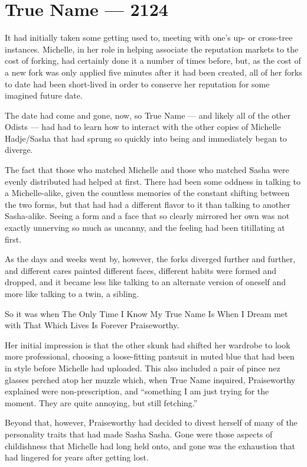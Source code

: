 \hypertarget{true-name-2124}{%
\chapter{True Name — 2124}\label{true-name-2124}}

It had initially taken some getting used to, meeting with one's up- or cross-tree instances. Michelle, in her role in helping associate the reputation markets to the cost of forking, had certainly done it a number of times before, but, as the cost of a new fork was only applied five minutes after it had been created, all of her forks to date had been short-lived in order to conserve her reputation for some imagined future date.

The date had come and gone, now, so True Name — and likely all of the other Odists — had had to learn how to interact with the other copies of Michelle Hadje/Sasha that had sprung so quickly into being and immediately began to diverge.

The fact that those who matched Michelle and those who matched Sasha were evenly distributed had helped at first. There had been some oddness in talking to a Michelle-alike, given the countless memories of the constant shifting between the two forms, but that had had a different flavor to it than talking to another Sasha-alike. Seeing a form and a face that so clearly mirrored her own was not exactly unnerving so much as uncanny, and the feeling had been titillating at first.

As the days and weeks went by, however, the forks diverged further and further, and different cares painted different faces, different habits were formed and dropped, and it became less like talking to an alternate version of oneself and more like talking to a twin, a sibling.

So it was when The Only Time I Know My True Name Is When I Dream met with That Which Lives Is Forever Praiseworthy.

Her initial impression is that the other skunk had shifted her wardrobe to look more professional, choosing a loose-fitting pantsuit in muted blue that had been in style before Michelle had uploaded. This also included a pair of pince nez glasses perched atop her muzzle which, when True Name inquired, Praiseworthy explained were non-prescription, and ``something I am just trying for the moment. They are quite annoying, but still fetching.''

Beyond that, however, Praiseworthy had decided to divest herself of many of the personality traits that had made Sasha Sasha. Gone were those aspects of childishness that Michelle had long held onto, and gone was the exhaustion that had lingered for years after getting lost.

